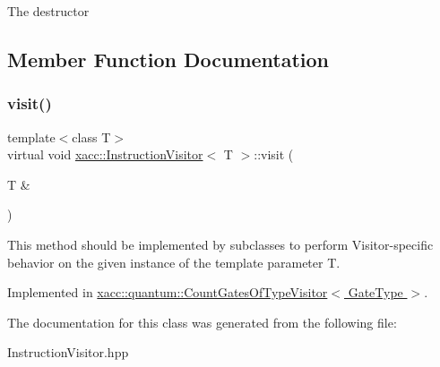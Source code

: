 The destructor 

\subsection{Member Function Documentation}
\mbox{\label{a01167_af0fead298f5bfbb8e6680433063e2c4b}} 
\subsubsection{\texorpdfstring{visit()}{visit()}}
{\footnotesize\ttfamily template$<$class T$>$ \\
virtual void \hyperlink{a01167}{xacc\+::\+Instruction\+Visitor}$<$ T $>$\+::visit (\begin{DoxyParamCaption}\item[{T \&}]{ }\end{DoxyParamCaption})\hspace{0.3cm}{\ttfamily [pure virtual]}}

This method should be implemented by subclasses to perform Visitor-\/specific behavior on the given instance of the template parameter T. 

Implemented in \hyperlink{a01087_a9c40e6cb4b74e2d6714c531ffc3b2909}{xacc\+::quantum\+::\+Count\+Gates\+Of\+Type\+Visitor$<$ Gate\+Type $>$}.



The documentation for this class was generated from the following file\+:\begin{DoxyCompactItemize}
\item 
Instruction\+Visitor.\+hpp\end{DoxyCompactItemize}
